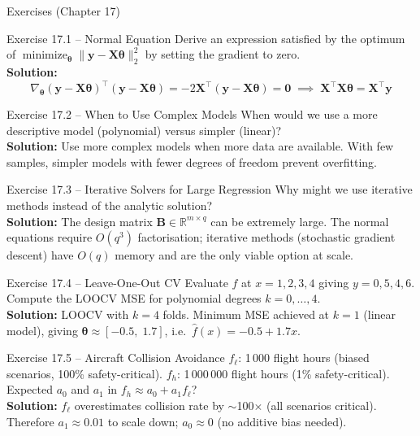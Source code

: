 \documentclass[aspectratio=169,10pt]{beamer}
\newcommand{\vy}{\mathbf{y}}
\newcommand{\btheta}{\boldsymbol{\theta}}
\newcommand{\bX}{\mathbf{X}}
\newcommand{\bB}{\mathbf{B}}
\newcommand{\R}{\mathbb{R}}
\newcommand{\hatf}{\hat{f}}
\DeclareMathOperator*{\minimize}{minimize}
\begin{document}
\begin{frame}[allowframebreaks]{Exercises (Chapter 17)}
  \begin{block}{Exercise 17.1 -- Normal Equation}
    Derive an expression satisfied by the optimum of
    $\minimize_{\btheta}\|\vy - \bX\btheta\|_2^2$ by setting the gradient to zero.
    \\[4pt]
    \textbf{Solution:}
    \[
      \nabla_{\btheta}(\vy - \bX\btheta)^{\top}(\vy - \bX\btheta)
      = -2\bX^{\top}(\vy - \bX\btheta) = \mathbf{0}
      \;\implies\;
      \bX^{\top}\bX\btheta = \bX^{\top}\vy
    \]
  \end{block}

  \begin{block}{Exercise 17.2 -- When to Use Complex Models}
    When would we use a more descriptive model (polynomial) versus simpler (linear)?
    \\[4pt]
    \textbf{Solution:} Use more complex models when more data are available.
    With few samples, simpler models with fewer degrees of freedom prevent overfitting.
  \end{block}

  \begin{block}{Exercise 17.3 -- Iterative Solvers for Large Regression}
    Why might we use iterative methods instead of the analytic solution?
    \\[4pt]
    \textbf{Solution:} The design matrix $\bB \in \R^{m \times q}$ can be extremely large.
    The normal equations require $O(q^3)$ factorisation; iterative methods (stochastic
    gradient descent) have $O(q)$ memory and are the only viable option at scale.
  \end{block}

  \framebreak

  \begin{block}{Exercise 17.4 -- Leave-One-Out CV}
    Evaluate $f$ at $x = 1,2,3,4$ giving $y = 0,5,4,6$.
    Compute the LOOCV MSE for polynomial degrees $k = 0,\ldots,4$.
    \\[4pt]
    \textbf{Solution:} LOOCV with $k=4$ folds.
    Minimum MSE achieved at $k=1$ (linear model), giving
    $\btheta \approx [-0.5,\;1.7]$, i.e.\ $\hatf(x) = -0.5 + 1.7x$.
  \end{block}

  \begin{block}{Exercise 17.5 -- Aircraft Collision Avoidance}
    $f_\ell$: 1\,000 flight hours (biased scenarios, 100\% safety-critical).
    $f_h$: 1\,000\,000 flight hours (1\% safety-critical).
    Expected $a_0$ and $a_1$ in $f_h \approx a_0 + a_1 f_\ell$?
    \\[4pt]
    \textbf{Solution:}
    $f_\ell$ overestimates collision rate by $\sim$100$\times$ (all scenarios critical).
    Therefore $a_1 \approx 0.01$ to scale down; $a_0 \approx 0$ (no additive bias needed).
  \end{block}
\end{frame}
\end{document}
